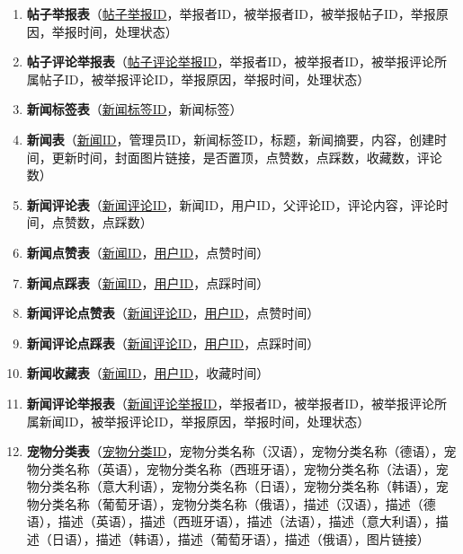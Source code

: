 \begin{enumerate}
    \item \textbf{帖子举报表}（\underline{帖子举报ID}，举报者ID，被举报者ID，被举报帖子ID，举报原因，举报时间，处理状态）
    \item \textbf{帖子评论举报表}（\underline{帖子评论举报ID}，举报者ID，被举报者ID，被举报评论所属帖子ID，被举报评论ID，举报原因，举报时间，处理状态）
    \item \textbf{新闻标签表}（\underline{新闻标签ID}，新闻标签）
    \item \textbf{新闻表}（\underline{新闻ID}，管理员ID，新闻标签ID，标题，新闻摘要，内容，创建时间，更新时间，封面图片链接，是否置顶，点赞数，点踩数，收藏数，评论数）
    \item \textbf{新闻评论表}（\underline{新闻评论ID}，新闻ID，用户ID，父评论ID，评论内容，评论时间，点赞数，点踩数）
    \item \textbf{新闻点赞表}（\underline{新闻ID}，\underline{用户ID}，点赞时间）
    \item \textbf{新闻点踩表}（\underline{新闻ID}，\underline{用户ID}，点踩时间）
    \item \textbf{新闻评论点赞表}（\underline{新闻评论ID}，\underline{用户ID}，点赞时间）
    \item \textbf{新闻评论点踩表}（\underline{新闻评论ID}，\underline{用户ID}，点踩时间）
    \item \textbf{新闻收藏表}（\underline{新闻ID}，\underline{用户ID}，收藏时间）
    \item \textbf{新闻评论举报表}（\underline{新闻评论举报ID}，举报者ID，被举报者ID，被举报评论所属新闻ID，被举报评论ID，举报原因，举报时间，处理状态）
    \item \textbf{宠物分类表}（\underline{宠物分类ID}，宠物分类名称（汉语），宠物分类名称（德语），宠物分类名称（英语），宠物分类名称（西班牙语），宠物分类名称（法语），宠物分类名称（意大利语），宠物分类名称（日语），宠物分类名称（韩语），宠物分类名称（葡萄牙语），宠物分类名称（俄语），描述（汉语），描述（德语），描述（英语），描述（西班牙语），描述（法语），描述（意大利语），描述（日语），描述（韩语），描述（葡萄牙语），描述（俄语），图片链接）

\end{enumerate}
